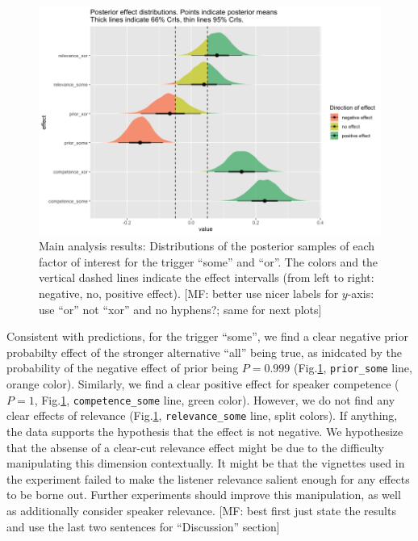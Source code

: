 \documentclass{sp}
\newcommand{\mf}[1]{\textcolor{BurntOrange}{[MF: #1]}}
\begin{document}
\begin{figure}[t]
	\begin{center}
		\includegraphics[width=1\linewidth]{images/posterior-effects-main.png}
	\end{center}
	\vspace{-0.3cm}
	\caption{Main analysis results: Distributions of the posterior samples of each factor of interest for the trigger ``some'' and ``or''. The colors and the vertical dashed lines indicate the effect intervalls (from left to right: negative, no, positive effect). \mf{better use nicer labels for $y$-axis: use ``or'' not ``xor'' and no hyphens?; same for next plots}}
	\label{posteriors-main}
\end{figure}

Consistent with predictions, for the trigger ``some'', we find a clear negative prior probabilty effect of the stronger alternative ``all'' being true, as inidcated by the probability of the negative effect of prior being $P = 0.999$ (Fig.\ref{posteriors-main}, \texttt{prior\_some} line, orange color). Similarly, we find a clear positive effect for speaker competence ($P =  1$, Fig.\ref{posteriors-main}, \texttt{competence\_some} line, green color). However, we do not find any clear effects of relevance (Fig.\ref{posteriors-main}, \texttt{relevance\_some} line, split colors). If anything, the data supports the hypothesis that the effect is not negative.
We hypothesize that the absense of a clear-cut relevance effect might be due to the difficulty manipulating this dimension contextually. It might be that the vignettes used in the experiment failed to make the listener relevance salient enough for any effects to be borne out. Further experiments should improve this manipulation, as well as additionally consider speaker relevance.
\mf{best first just state the results and use the last two sentences for ``Discussion'' section}
\end{document}
